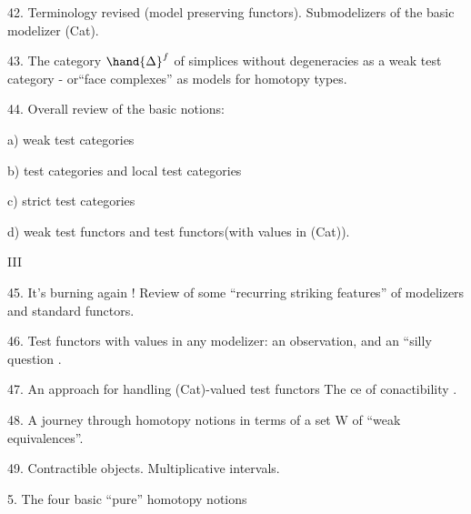 42.  Terminology revised (model preserving functors).  Submodelizers of
the basic modelizer (Cat).

43.  The category $\hand{\Delta}^{f}$ of simplices without degeneracies as a weak test
category  -  or``face complexes'' as models for homotopy types.

44.  Overall review of the basic notions:

a)  weak test categories

b)  test categories and local test categories

c) strict test categories

d) weak test functors and test functors(with values in (Cat)).

   \hand{)}
III \hand{(}

45.  It's burning again ! Review of some ``recurring striking features''
of modelizers\hand{,} and  standard   functors.

\hand{(}46.\hand{)} Test functors with values in any modelizer: an observation, and an 
``silly question .

47.  An approach for handling (Cat)-valued test functors\hand{,}  The %
ce of conactibility .

48. \deleted{(}A journey through  homotopy notions\hand{,} \unsure{\deleted{(}}in terms of a set W of ``weak
equivalences''\deleted{)}.

49.  Contractible objects.  Multiplicative intervals.

\hand{(}5.\hand{)} The four basic ``pure'' homotopy notions   

